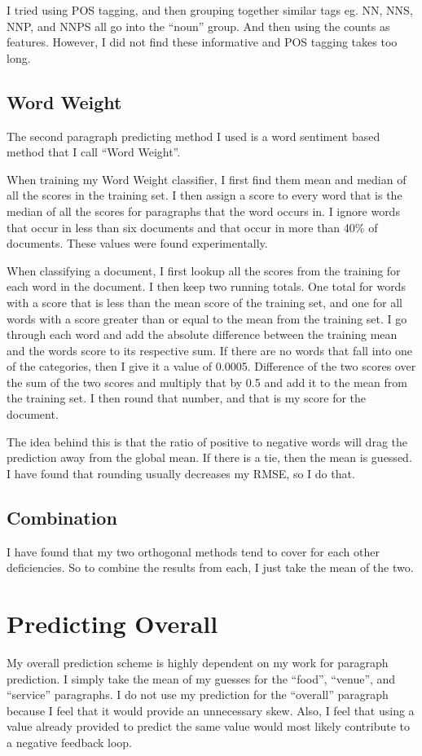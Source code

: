 \documentclass[]{IEEEtran}
\begin{document}
I tried using POS tagging, and then grouping together similar tags eg. NN, NNS, NNP, and NNPS all go into the ``noun''
group. And then using the counts as features. However, I did not find these informative and POS tagging takes too long.

\subsection{Word Weight}
The second paragraph predicting method I used is a word sentiment based method that I call ``Word Weight''.

When training my Word Weight classifier, I first find them mean and median of all the scores in the training set. I then
assign a score to every word that is the median of all the scores for paragraphs that the word occurs in. I ignore words that
occur in less than six documents and that occur in more than 40\% of documents. These values were found experimentally.

When classifying a document, I first lookup all the scores from the training for each word in the document.
I then keep two running totals. One total for words with a score that is less than the mean score of the training set, and
one for all words with a score greater than or equal to the mean from the training set. I go through each word and add the
absolute difference between the training mean and the words score to its respective sum. If there are no words that fall into
one of the categories, then I give it a value of 0.0005. Difference of the two scores over the sum of the two scores and multiply
that by 0.5 and add it to the mean from the training set. I then round that number, and that is my score for the document.

The idea behind this is that the ratio of positive to negative words will drag the prediction away from the global mean. If
there is a tie, then the mean is guessed. I have found that rounding usually decreases my RMSE, so I do that.

\subsection{Combination}
I have found that my two orthogonal methods tend to cover for each other deficiencies. So to combine the results from each,
I just take the mean of the two.

\section{Predicting Overall}
My overall prediction scheme is highly dependent on my work for paragraph prediction. I simply take the mean of my guesses for
the ``food'', ``venue'', and ``service'' paragraphs. I do not use my prediction for the ``overall'' paragraph because I feel that
it would provide an unnecessary skew. Also, I feel that using a value already provided to predict the same value would most likely
contribute to a negative feedback loop.
\end{document}

